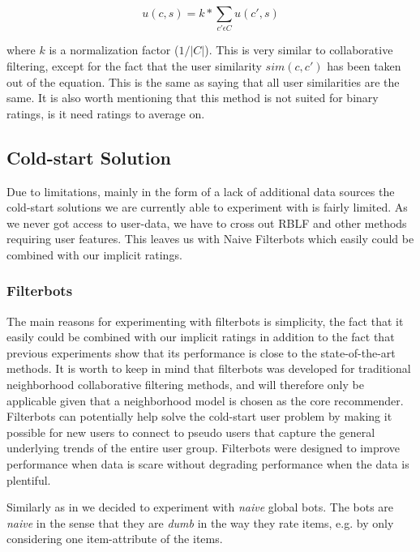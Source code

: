 \begin{equation}
\label{equation:itemaverageratingprediction}
u(c,s) = k * \sum_{c' \epsilon C} u(c',s)
\end{equation}

where $k$ is a normalization factor ($1/|C|$). This is very similar to collaborative filtering, except for
the fact that the user similarity $sim(c, c')$ has been taken out of the equation. This is the same as saying
that all user similarities are the same. It is also worth mentioning that this method is not suited for binary
ratings, is it need ratings to average on.

\subsection{Cold-start Solution}

Due to limitations, mainly in the form of a lack of additional data sources the cold-start solutions
we are currently able to experiment with is fairly limited. As we never got access to
user-data, we have to cross out RBLF and other methods requiring user features. This leaves us with
Naive Filterbots \cite{Park2006} which easily could be combined with our implicit ratings.

\subsubsection{Filterbots}
\label{implementation-filterbots}

The main reasons for experimenting with filterbots is simplicity, the fact that it easily could
be combined with our implicit ratings in addition to the fact that previous experiments \cite{Agarwal2009, Agarwal2010}
show that its performance is close to the state-of-the-art methods. It is worth to keep in mind that filterbots was
developed for traditional neighborhood collaborative filtering methods, and will therefore only be applicable given
that a neighborhood model is chosen as the core recommender. Filterbots can potentially help solve the cold-start user
problem by making it possible for new users to connect to pseudo users that capture the general underlying trends of the entire
user group. Filterbots were designed to improve performance when data is scare without degrading performance when the data
is plentiful.

Similarly as in \cite{Park2006} we decided to experiment with \emph{naive} global bots. The bots are \emph{naive}
in the sense that they are \emph{dumb} in the way they rate items, e.g. by only considering one item-attribute of the items.

